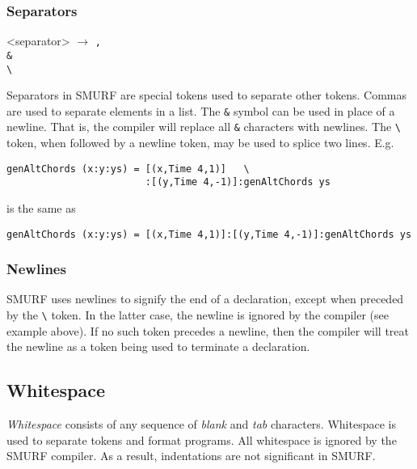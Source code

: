 \subsubsection{Separators}

\begin{grammar}
<separator> $\rightarrow$ \texttt{,} \\
												  \texttt{\&} \\
													\texttt{\textbackslash}
\end{grammar}

Separators in SMURF are special tokens used to separate other tokens. 
Commas are used to separate elements in a list.
The \texttt{\&} symbol can be used in place of a newline. That is, the compiler
will replace all \texttt{\&} characters with newlines. The
\texttt{\textbackslash} token, when followed by a newline token,
may be used to splice two lines. E.g.
\begin{lstlisting}
genAltChords (x:y:ys) = [(x,Time 4,1)]   \
                        :[(y,Time 4,-1)]:genAltChords ys
\end{lstlisting}
is the same as 
\begin{lstlisting}
genAltChords (x:y:ys) = [(x,Time 4,1)]:[(y,Time 4,-1)]:genAltChords ys
\end{lstlisting}

\subsubsection{Newlines}
SMURF uses newlines to signify the end of a declaration, except
when preceded by the \texttt{\textbackslash} token. In the latter case, the newline is ignored by the compiler 
(see example above). If no such token precedes a newline, then the compiler will treat the newline as
a token being used to terminate a declaration.

\subsection{Whitespace}
\label{sec:whitespaces}
{\it Whitespace} consists of any sequence of {\it blank} and {\it tab} characters.
Whitespace is used to
separate tokens and format programs. All whitespace is ignored by the
SMURF compiler. As a result, indentations are not significant in SMURF.


